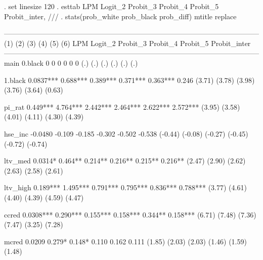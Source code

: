 \documentclass{scrartcl}
\begin{document}
\begin{SinputC}
. set linesize 120
. esttab LPM Logit_2 Probit_3 Probit_4 Probit_5 Probit_inter, ///
. 	stats(prob_white prob_black prob_diff)  mtitle replace
\end{SinputC}
\begin{STinyoutputC}
------------------------------------------------------------------------------------------------------------
                      (1)             (2)             (3)             (4)             (5)             (6)
                      LPM         Logit_2        Probit_3        Probit_4        Probit_5    Probit_inter
------------------------------------------------------------------------------------------------------------
main
0.black                 0               0               0               0               0               0
                      (.)             (.)             (.)             (.)             (.)             (.)

1.black            0.0837***        0.688***        0.389***        0.371***        0.363***        0.246
                   (3.71)          (3.78)          (3.98)          (3.76)          (3.64)          (0.63)

pi_rat              0.449***        4.764***        2.442***        2.464***        2.622***        2.572***
                   (3.95)          (3.58)          (4.01)          (4.11)          (4.30)          (4.39)

hse_inc           -0.0480          -0.109          -0.185          -0.302          -0.502          -0.538
                  (-0.44)         (-0.08)         (-0.27)         (-0.45)         (-0.72)         (-0.74)

ltv_med            0.0314*          0.464**         0.214**         0.216**         0.215**         0.216**
                   (2.47)          (2.90)          (2.62)          (2.63)          (2.58)          (2.61)

ltv_high            0.189***        1.495***        0.791***        0.795***        0.836***        0.788***
                   (3.77)          (4.61)          (4.40)          (4.39)          (4.59)          (4.47)

ccred              0.0308***        0.290***        0.155***        0.158***        0.344**         0.158***
                   (6.71)          (7.48)          (7.36)          (7.47)          (3.25)          (7.28)

mcred              0.0209           0.279*          0.148*          0.110           0.162           0.111
                   (1.85)          (2.03)          (2.03)          (1.46)          (1.59)          (1.48)


\end{STinyoutputC}
\end{document}
